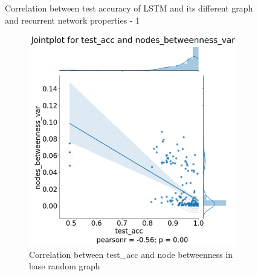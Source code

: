 \begin{figure}[H]
\caption[Correlation between test accuracy of LSTM and its different graph and recurrent network properties - 1]{Correlation between test accuracy of LSTM and its different graph and recurrent network properties - 1} \label{fig:lstm_correlation_1}
\end{figure}

\begin{figure}[H]
    \centering
    \begin{subfigure}{0.45\textwidth}
        \includegraphics[width=\linewidth]{images/results/random/lstm/jointplot_test_acc_nodes_betweenness_var.png}
        \caption{Correlation between test\_acc and node betweenness in base random graph} \label{fig:jp_lstm_node_bn}
    \end{subfigure}
    \hfill
    \begin{subfigure}{0.45\textwidth}

\end{subfigure}
\end{figure}
